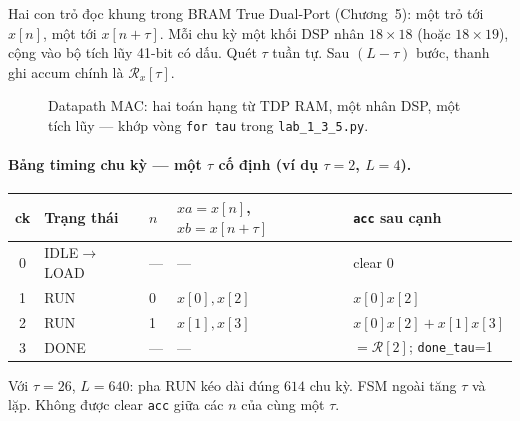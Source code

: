 Hai con trỏ đọc khung trong BRAM True Dual-Port (Chương~5): một trỏ tới $x[n]$, một tới $x[n+\tau]$. Mỗi chu kỳ một khối DSP nhân $18\times 18$ (hoặc $18\times 19$), cộng vào bộ tích lũy 41-bit có dấu. Quét $\tau$ tuần tự. Sau $(L-\tau)$ bước, thanh ghi accum chính là $\mathcal{R}_x[\tau]$.

\begin{figure}[H]
\centering
{}
\caption{Datapath MAC: hai toán hạng từ TDP RAM, một nhân DSP, một tích lũy --- khớp vòng \texttt{for tau} trong \texttt{lab\_1\_3\_5.py}.}
\label{fig:ch07_mac_datapath}
\end{figure}

\paragraph{Bảng timing chu kỳ --- một $\tau$ cố định (ví dụ $\tau=2$, $L=4$).}
\begin{center}\small
\begin{tabular}{@{}cllll@{}}\toprule
ck & Trạng thái & $n$ & $xa{=}x[n]$, $xb{=}x[n{+}\tau]$ & \texttt{acc} sau cạnh \\
\midrule
0 & IDLE$\to$LOAD & --- & --- & clear $0$ \\
1 & RUN & 0 & $x[0],x[2]$ & $x[0]x[2]$ \\
2 & RUN & 1 & $x[1],x[3]$ & $x[0]x[2]+x[1]x[3]$ \\
3 & DONE & --- & --- & $=\mathcal{R}[2]$; \texttt{done\_tau}=1 \\
\bottomrule
\end{tabular}
\end{center}
Với $\tau=26$, $L=640$: pha RUN kéo dài đúng $614$ chu kỳ. FSM ngoài tăng $\tau$ và lặp. Không được clear \texttt{acc} giữa các $n$ của cùng một $\tau$.

